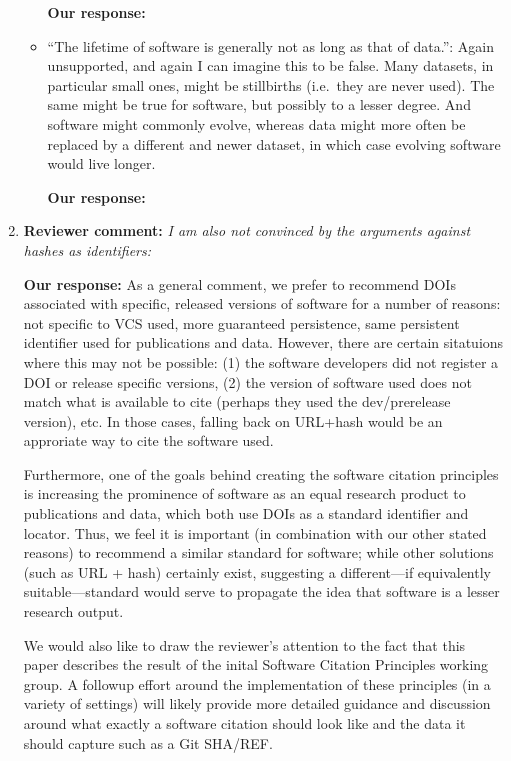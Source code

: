 \documentclass{article}
\begin{document}
\begin{enumerate}
\begin{itemize}
\textbf{Our response:}


\item{``The lifetime of software is generally not as long as that of data.'':
Again unsupported, and again I can imagine this to be false. Many datasets, in
particular small ones, might be stillbirths (i.e.\ they are never used). The
same might be true for software, but possibly to a lesser degree. And software
might commonly evolve, whereas data might more often be replaced by a
different and newer dataset, in which case evolving software would live
longer.}

\textbf{Our response:}

\end{itemize}

\item \textbf{Reviewer comment:}
\emph{I am also not convinced by the arguments against hashes as identifiers:}

\textbf{Our response:}
As a general comment, we prefer to recommend DOIs associated with specific,
released versions of software for a number of reasons: not specific to VCS used,
more guaranteed persistence, same persistent identifier used for publications and data.
However, there are certain sitatuions where this may not be possible:
(1) the software developers did not register a DOI or release specific
versions, (2) the version of software used does not match what is available
to cite (perhaps they used the dev/prerelease version), etc. In those cases,
falling back on URL+hash would be an approriate way to cite the software used.

Furthermore, one of the goals behind creating the software citation principles
is increasing the prominence of software as an equal research product to
publications and data, which both use DOIs as a standard identifier and locator.
Thus, we feel it is important (in combination with our other stated reasons) to
recommend a similar standard for software; while other solutions (such as URL +
hash) certainly exist, suggesting a different---if equivalently suitable---standard
would serve to propagate the idea that software is a lesser research output.

We would also like to draw the reviewer's attention to the fact that this paper
describes the result of the inital Software Citation Principles working group. A
followup effort around the implementation of these principles (in a variety of
settings) will likely provide more detailed guidance and discussion around what
exactly a software citation should look like and the data it should capture such
as a Git SHA/REF.


\end{enumerate}
\end{document}
